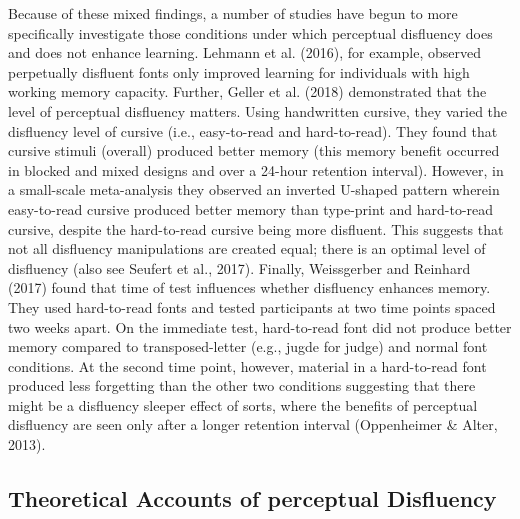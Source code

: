 \documentclass[
  english,
  jou]{apa7}
\begin{document}
Because of these mixed findings, a number of studies have begun to more specifically investigate those conditions under which perceptual disfluency does and does not enhance learning. Lehmann et al. (2016), for example, observed perpetually disfluent fonts only improved learning for individuals with high working memory capacity. Further, Geller et al. (2018) demonstrated that the level of perceptual disfluency matters. Using handwritten cursive, they varied the disfluency level of cursive (i.e., easy-to-read and hard-to-read). They found that cursive stimuli (overall) produced better memory (this memory benefit occurred in blocked and mixed designs and over a 24-hour retention interval). However, in a small-scale meta-analysis they observed an inverted U-shaped pattern wherein easy-to-read cursive produced better memory than type-print and hard-to-read cursive, despite the hard-to-read cursive being more disfluent. This suggests that not all disfluency manipulations are created equal; there is an optimal level of disfluency (also see Seufert et al., 2017). Finally, Weissgerber and Reinhard (2017) found that time of test influences whether disfluency enhances memory. They used hard-to-read fonts and tested participants at two time points spaced two weeks apart. On the immediate test, hard-to-read font did not produce better memory compared to transposed-letter (e.g., jugde for judge) and normal font conditions. At the second time point, however, material in a hard-to-read font produced less forgetting than the other two conditions suggesting that there might be a disfluency sleeper effect of sorts, where the benefits of perceptual disfluency are seen only after a longer retention interval (Oppenheimer \& Alter, 2013).

\hypertarget{theoretical-accounts-of-perceptual-disfluency}{%
\subsection{Theoretical Accounts of perceptual Disfluency}\label{theoretical-accounts-of-perceptual-disfluency}}
\end{document}

